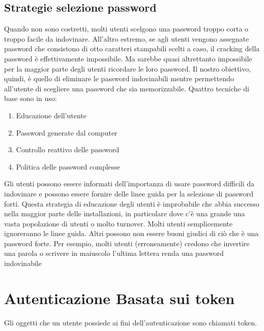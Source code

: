 \subsection{Strategie selezione password}
Quando non sono costretti, molti utenti scelgono una password troppo corta o troppo facile da indovinare. All'altro estremo, se agli utenti vengono assegnate password che consistono di otto caratteri stampabili scelti a caso, il cracking della password è effettivamente impossibile. Ma sarebbe quasi altrettanto impossibile per la maggior parte degli utenti ricordare le loro password. Il nostro obiettivo, quindi, è quello di eliminare le password indovinabili mentre permettendo all'utente di scegliere una password che sia memorizzabile. Quattro tecniche di base sono in uso:
\begin{enumerate}
    \item Educazione dell'utente
    \item Password generate dal computer
    \item Controllo reattivo delle password
    \item Politica delle password complesse
\end{enumerate}
\singlespacing
Gli utenti possono essere informati dell'importanza di usare password difficili da indovinare e possono essere fornire delle linee guida per la selezione di password forti. Questa strategia di educazione degli utenti è improbabile che abbia successo nella maggior parte delle installazioni, in particolare dove c'è una grande una vasta popolazione di utenti o molto turnover. Molti utenti semplicemente ignoreranno le linee guida. Altri possono non essere buoni giudici di ciò che è una password forte. Per esempio, molti utenti (erroneamente) credono che invertire una parola o scrivere in maiuscolo l'ultima lettera renda una password indovinabile
\newpage
\section{Autenticazione Basata sui token}
Gli oggetti che un utente possiede ai fini dell'autenticazione sono chiamati token.
